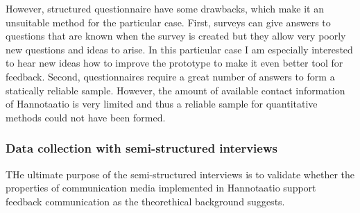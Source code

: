 \documentclass[english,12pt,a4paper,pdftex]{article}
\begin{document}
However, structured questionnaire have some drawbacks, which make it an unsuitable method for the particular case. First, surveys can give answers to questions that are known when the survey is created but they allow very poorly new questions and ideas to arise. In this particular case I am especially interested to hear new ideas how to improve the prototype to make it even better tool for feedback. Second, questionnaires require a great number of answers to form a statically reliable sample. However, the amount of available contact information of Hannotaatio is very limited and thus a reliable sample for quantitative methods could not have been formed.

\subsubsection{Data collection with semi-structured interviews}

THe ultimate purpose of the semi-structured interviews is to validate whether the properties of communication media implemented in Hannotaatio support feedback communication as the theorethical background suggests. 

\citep{silverman2009doing}

\end{document}
